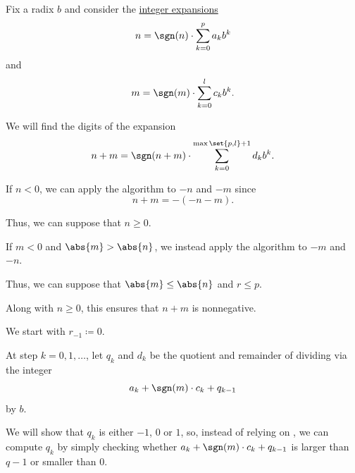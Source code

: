 \begin{algorithm}\label{alg:addition_with_carrying}
  Fix a radix \( b \) and consider the \hyperref[def:integer_radix_expansion]{integer expansions}
  \begin{equation*}
    n = \sgn(n) \cdot \sum_{k=0}^p a_k b^k
  \end{equation*}
  and
  \begin{equation*}
    m = \sgn(m) \cdot \sum_{k=0}^l c_k b^k.
  \end{equation*}

  We will find the digits of the expansion
  \begin{equation*}
    n + m = \sgn(n + m) \cdot \sum_{k=0}^{\max\set{ p, l } + 1} d_k b^k.
  \end{equation*}

  \begin{thmenum}
     If \( n < 0 \), we can apply the algorithm to \( -n \) and \( -m \) since
    \begin{equation*}
      n + m = -(-n - m).
    \end{equation*}

    Thus, we can suppose that \( n \geq 0 \).

     If \( m < 0 \) and \( \abs{m} > \abs{n} \), we instead apply the algorithm to \( -m \) and \( -n \).

    Thus, we can suppose that \( \abs{m} \leq \abs{n} \) and \( r \leq p \).

    Along with \( n \geq 0 \), this ensures that \( n + m \) is nonnegative.

     We start with \( r_{-1} \coloneqq 0 \).

     At step \( k = 0, 1, \ldots \), let \( q_k \) and \( d_k \) be the quotient and remainder of dividing via  the integer
    \begin{equation}\label{eq:alg:addition_with_carrying/step/quot}
      a_k + \sgn(m) \cdot c_k + q_{k - 1}
    \end{equation}
    by \( b \).

    We will show that \( q_k \) is either \( -1 \), \( 0 \) or \( 1 \), so, instead of relying on , we can compute \( q_k \) by simply checking whether \( a_k + \sgn(m) \cdot c_k + q_{k - 1} \) is larger than \( q - 1 \) or smaller than \( 0 \).
  \end{thmenum}
\end{algorithm}
